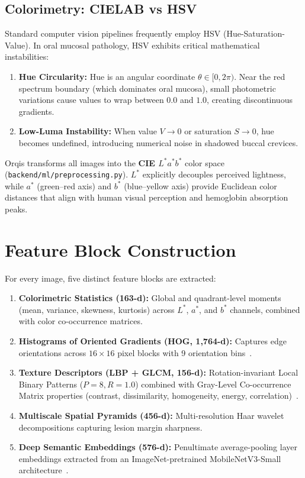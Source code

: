 \documentclass[11pt,a4paper]{report}
\newcommand{\artifact}[1]{\nolinkurl{#1}}
\begin{document}
\subsection{Colorimetry: CIELAB vs HSV}
Standard computer vision pipelines frequently employ HSV (Hue-Saturation-Value). In oral mucosal pathology, HSV exhibits critical mathematical instabilities:
\begin{enumerate}
  \item \textbf{Hue Circularity:} Hue is an angular coordinate $\theta \in [0, 2\pi)$. Near the red spectrum boundary (which dominates oral mucosa), small photometric variations cause values to wrap between $0.0$ and $1.0$, creating discontinuous gradients.
  \item \textbf{Low-Luma Instability:} When value $V \to 0$ or saturation $S \to 0$, hue becomes undefined, introducing numerical noise in shadowed buccal crevices.
\end{enumerate}
Orqis transforms all images into the \textbf{CIE $L^*a^*b^*$} color space (\artifact{backend/ml/preprocessing.py}). $L^*$ explicitly decouples perceived lightness, while $a^*$ (green--red axis) and $b^*$ (blue--yellow axis) provide Euclidean color distances that align with human visual perception and hemoglobin absorption peaks.

\section{Feature Block Construction}
For every image, five distinct feature blocks are extracted:
\begin{enumerate}
  \item \textbf{Colorimetric Statistics (163-d):} Global and quadrant-level moments (mean, variance, skewness, kurtosis) across $L^*$, $a^*$, and $b^*$ channels, combined with color co-occurrence matrices.
  \item \textbf{Histograms of Oriented Gradients (HOG, 1,764-d):} Captures edge orientations across $16 \times 16$ pixel blocks with 9 orientation bins~\cite{dalal2005histograms}.
  \item \textbf{Texture Descriptors (LBP + GLCM, 156-d):} Rotation-invariant Local Binary Patterns ($P=8, R=1.0$) combined with Gray-Level Co-occurrence Matrix properties (contrast, dissimilarity, homogeneity, energy, correlation)~\cite{ojala2002multiresolution}.
  \item \textbf{Multiscale Spatial Pyramids (456-d):} Multi-resolution Haar wavelet decompositions capturing lesion margin sharpness.
  \item \textbf{Deep Semantic Embeddings (576-d):} Penultimate average-pooling layer embeddings extracted from an ImageNet-pretrained MobileNetV3-Small architecture~\cite{howard2019searching}.
\end{enumerate}
\end{document}
